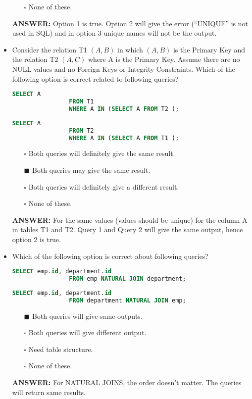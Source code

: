 \documentclass[10pt]{article}
\begin{document}
\begin{itemize}
\begin{enumerate}
				\item[$\square$] None of these.
			\end{enumerate}
			\color{red} \textbf{ANSWER:} \color{black} Option 1 is true. Option 2 will give the error (“UNIQUE” is not used in SQL) and in option 3 unique names will not be the output.

		\item Consider the relation T1 $(A,B)$ in which $(A,B)$ is the Primary Key and the relation T2 $(A,C)$ where A is the Primary Key. Assume there are no NULL values and no Foreign Keys or Integrity Constraints. Which of the following option is correct related to following queries?
			\begin{lstlisting}[language=SQL,firstline=1, lastline=3] 
				SELECT A 
				FROM T1 
				WHERE A IN (SELECT A FROM T2 );
			\end{lstlisting}
			\begin{lstlisting}[language=SQL,firstline=1, lastline=3] 
				SELECT A 
				FROM T2 
				WHERE A IN (SELECT A FROM T1 );
			\end{lstlisting}

			\begin{enumerate}
				\item[$\square$] Both queries will definitely give the same result.
				\item[$\blacksquare$] Both queries may give the same result.
				\item[$\square$] Both queries will definitely give a different result.
				\item[$\square$] None of these.
			\end{enumerate}
			\color{red} \textbf{ANSWER:} \color{black} For the same values (values should be unique) for the column A in tables T1 and T2. Query 1 and Query 2 will give the same output, hence option 2 is true.

		\item Which of the following option is correct about following queries?
			\begin{lstlisting}[language=SQL,firstline=1, lastline=2] 
				SELECT emp.id, department.id 
				FROM emp NATURAL JOIN department;
			\end{lstlisting}
			\begin{lstlisting}[language=SQL,firstline=1, lastline=2] 
				SELECT emp.id, department.id 
				FROM department NATURAL JOIN emp;
			\end{lstlisting}
			\begin{enumerate}
				\item[$\blacksquare$] Both queries will give same outputs.
				\item[$\square$] Both queries will give different output.
				\item[$\square$] Need table structure.
				\item[$\square$] None of these.
			\end{enumerate}
			\color{red} \textbf{ANSWER:} \color{black} For NATURAL JOINS, the order doesn’t matter. The queries will return same results.


\end{itemize}
\end{document}
